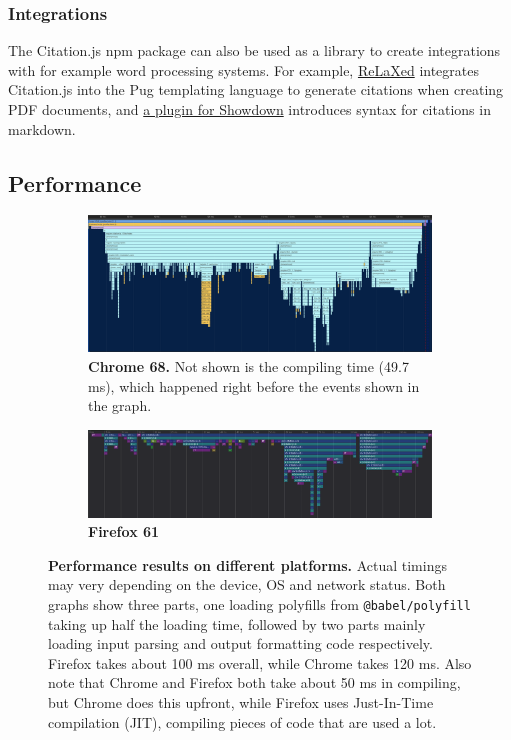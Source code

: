 \documentclass[fleqn,10pt,lineno]{wlpeerj} %
\begin{document}
\subsubsection*{Integrations}

The Citation.js npm package can also be used as a library to create integrations with for example word processing systems. For example, \href{https://github.com/RelaxedJS/ReLaXed}{ReLaXed} integrates Citation.js into the Pug templating language to generate citations when creating PDF documents, and \href{https://github.com/larsgw/citation.js-showdown}{a plugin for Showdown} introduces syntax for citations in markdown.

\subsection*{Performance}

\begin{figure}[ht]
\begin{subfigure}{\textwidth}
  \centering
  \includegraphics[width=\linewidth]{figures/perf_chrome.png}
  \caption{\textbf{Chrome 68.} Not shown is the compiling time (49.7 ms), which happened right before the events shown in the graph.}
  \label{fig:perf-chrome}
\end{subfigure}
\begin{subfigure}{\textwidth}
  \centering
  \includegraphics[width=\linewidth]{figures/perf_ff.png}
  \caption{\textbf{Firefox 61}}
  \label{fig:perf-ff}
\end{subfigure}
\caption{\textbf{Performance results on different platforms.}
Actual timings may very depending on the device, OS and network status. Both graphs show three parts, one loading polyfills from \texttt{@babel/polyfill} taking up half the loading time, followed by two parts mainly loading input parsing and output formatting code respectively. Firefox takes about 100 ms overall, while Chrome takes 120 ms. Also note that Chrome and Firefox both take about 50 ms in compiling, but Chrome does this upfront, while Firefox uses Just-In-Time compilation (JIT), compiling pieces of code that are used a lot.}
\label{fig:perf}
\end{figure}
\end{document}
